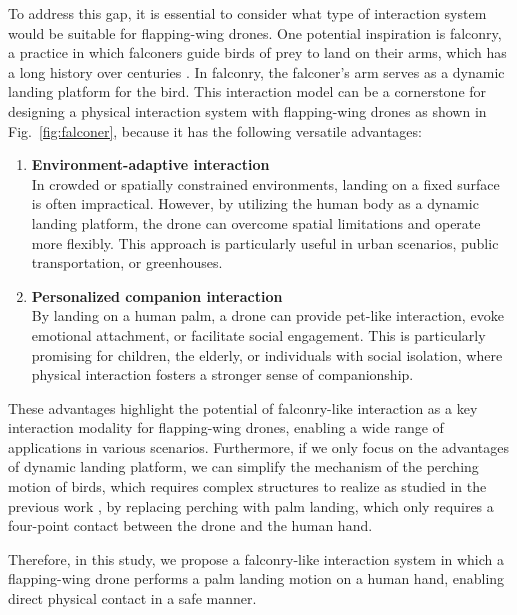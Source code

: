 To address this gap, it is essential to consider what type of interaction system would be suitable for flapping-wing drones.
One potential inspiration is falconry, a practice in which falconers guide birds of prey to land on their arms, which has a long history over centuries \cite{oggins2019falconry}.
In falconry, the falconer's arm serves as a dynamic landing platform for the bird.
This interaction model can be a cornerstone for designing a physical interaction system with flapping-wing drones as shown in Fig.~\ref{fig:falconer}, 
because it has the following versatile advantages:
\begin{enumerate}
    \item \textbf{Environment-adaptive interaction}\\  
    In crowded or spatially constrained environments, landing on a fixed surface is often impractical.  
    However, by utilizing the human body as a dynamic landing platform, the drone can overcome spatial limitations and operate more flexibly.  
    This approach is particularly useful in urban scenarios, public transportation, or greenhouses.
    \item \textbf{Personalized companion interaction}\\  
    By landing on a human palm, a drone can provide pet-like interaction, evoke emotional attachment, or facilitate social engagement.  
    This is particularly promising for children, the elderly, or individuals with social isolation, where physical interaction fosters a stronger sense of companionship.
\end{enumerate}
These advantages highlight the potential of falconry-like interaction as a key interaction modality for flapping-wing drones, enabling a wide range of applications in various scenarios.
Furthermore, if we only focus on the advantages of dynamic landing platform, we can simplify the mechanism of the perching motion of birds, which requires complex structures to realize as studied in the previous work \cite{roderick2021bird-inspired-perching},
by replacing perching with palm landing, which only requires a four-point contact between the drone and the human hand.

Therefore, in this study, we propose a falconry-like interaction system in which a flapping-wing drone performs a palm landing motion on a human hand, enabling direct physical contact in a safe manner.

